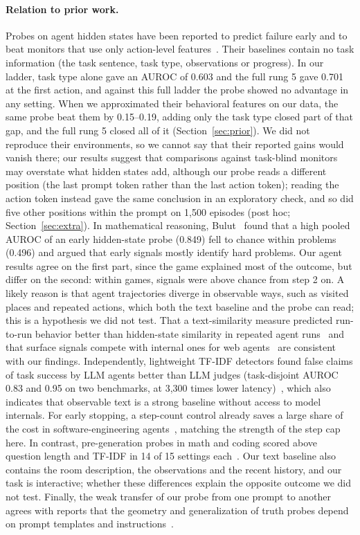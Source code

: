 \documentclass[11pt]{article}
\begin{document}
\paragraph{Relation to prior work.} Probes on agent hidden states have been reported to predict failure early and to beat monitors that use only action-level features~\cite{ruan2026doomed}.
Their baselines contain no task information (the task sentence, task type, observations or progress). In our ladder, task type alone gave an AUROC of 0.603 and the full rung 5 gave 0.701 at the first action,
and against this full ladder the probe showed no advantage in any setting. When we approximated their behavioral features on our data, the same probe beat them by 0.15--0.19, adding only the task type closed part of that gap, and the full rung 5 closed all of it (Section~\ref{sec:prior}).
We did not reproduce their environments, so we cannot say that their reported gains would vanish there; our results suggest that comparisons against task-blind monitors may overstate what hidden states add, although our probe reads a different position (the last prompt token rather than the last action token); reading the action token instead gave the same conclusion in an exploratory check, and so did five other positions within the prompt on 1,500 episodes (post hoc; Section~\ref{sec:extra}).
In mathematical reasoning, Bulut~\cite{bulut2026problem} found that a high pooled AUROC of an early hidden-state probe (0.849) fell to chance within problems (0.496) and argued that early signals mostly identify hard problems.
Our agent results agree on the first part, since the game explained most of the outcome, but differ on the second: within games, signals were above chance from step 2 on. A likely reason is that agent trajectories diverge in observable ways, such as visited places and repeated actions,
which both the text baseline and the probe can read; this is a hypothesis we did not test.
That a text-similarity measure predicted run-to-run behavior better than hidden-state similarity in repeated agent runs~\cite{mehta2026commit} and that surface signals compete with internal ones for web agents~\cite{pan2026monitoring} are consistent with our findings. Independently, lightweight TF-IDF detectors found false claims of task success by LLM agents better than LLM judges (task-disjoint AUROC 0.83 and 0.95 on two benchmarks, at 3,300 times lower latency)~\cite{advani2026false}, which also indicates that observable text is a strong baseline without access to model internals.
For early stopping, a step-count control already saves a large share of the cost in software-engineering agents~\cite{wang2026failfast}, matching the strength of the step cap here.
In contrast, pre-generation probes in math and coding scored above question length and TF-IDF in 14 of 15 settings each~\cite{lugoloobi2026failures}. Our text baseline also contains the room description, the observations and the recent history, and our task is interactive; whether these differences explain the opposite outcome we did not test.
Finally, the weak transfer of our probe from one prompt to another agrees with reports that the geometry and generalization of truth probes depend on prompt templates and instructions~\cite{poulis2026truth}.
\end{document}
